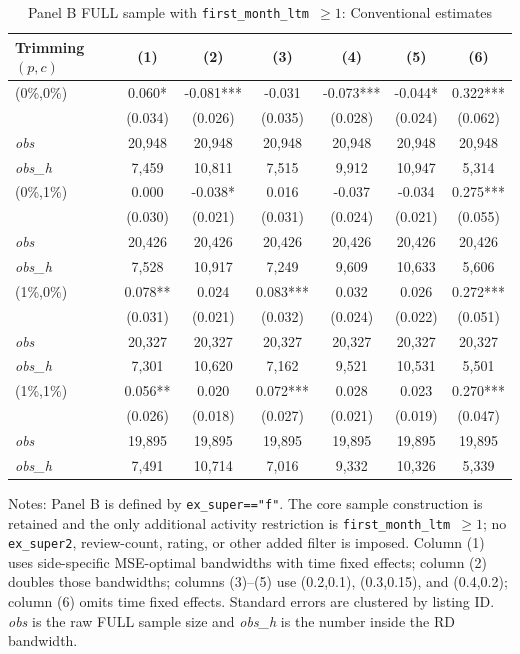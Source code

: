 \documentclass[10pt]{article}
\begin{document}
\begin{table}[!htbp]
\centering
\caption{Panel B FULL sample with \texttt{first\_month\_ltm $\geq 1$}: Conventional estimates}
\label{tab:panel_b_full_first_month_ltm}
\small
\begin{tabular}{lcccccc}
\toprule
Trimming $(p,c)$ & (1) & (2) & (3) & (4) & (5) & (6) \\
\midrule
(0\%,0\%) & 0.060* & -0.081*** & -0.031 & -0.073*** & -0.044* & 0.322*** \\
 & (0.034) & (0.026) & (0.035) & (0.028) & (0.024) & (0.062) \\
\textit{obs} & 20,948 & 20,948 & 20,948 & 20,948 & 20,948 & 20,948 \\
\textit{obs\_h} &  7,459 & 10,811 &  7,515 &  9,912 & 10,947 &  5,314 \\

(0\%,1\%) & 0.000 & -0.038* & 0.016 & -0.037 & -0.034 & 0.275*** \\
 & (0.030) & (0.021) & (0.031) & (0.024) & (0.021) & (0.055) \\
\textit{obs} & 20,426 & 20,426 & 20,426 & 20,426 & 20,426 & 20,426 \\
\textit{obs\_h} &  7,528 & 10,917 &  7,249 &  9,609 & 10,633 &  5,606 \\

(1\%,0\%) & 0.078** & 0.024 & 0.083*** & 0.032 & 0.026 & 0.272*** \\
 & (0.031) & (0.021) & (0.032) & (0.024) & (0.022) & (0.051) \\
\textit{obs} & 20,327 & 20,327 & 20,327 & 20,327 & 20,327 & 20,327 \\
\textit{obs\_h} &  7,301 & 10,620 &  7,162 &  9,521 & 10,531 &  5,501 \\

(1\%,1\%) & 0.056** & 0.020 & 0.072*** & 0.028 & 0.023 & 0.270*** \\
 & (0.026) & (0.018) & (0.027) & (0.021) & (0.019) & (0.047) \\
\textit{obs} & 19,895 & 19,895 & 19,895 & 19,895 & 19,895 & 19,895 \\
\textit{obs\_h} &  7,491 & 10,714 &  7,016 &  9,332 & 10,326 &  5,339 \\

\bottomrule
\end{tabular}
\begin{minipage}{0.98\textwidth}\footnotesize
Notes: Panel B is defined by \texttt{ex\_super=="f"}. The core sample construction is retained and the only additional activity restriction is \texttt{first\_month\_ltm $\geq 1$}; no \texttt{ex\_super2}, review-count, rating, or other added filter is imposed. Column (1) uses side-specific MSE-optimal bandwidths with time fixed effects; column (2) doubles those bandwidths; columns (3)--(5) use (0.2,0.1), (0.3,0.15), and (0.4,0.2); column (6) omits time fixed effects. Standard errors are clustered by listing ID. \textit{obs} is the raw FULL sample size and \textit{obs\_h} is the number inside the RD bandwidth.
\end{minipage}
\end{table}
\end{document}
